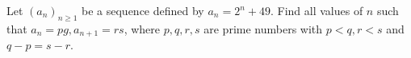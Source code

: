 Let $(a_{n})_{n\geq 1}$ be a sequence defined by $a_{n}=2^{n}+49$. Find all values of $n$ such that $a_{n}=pg, a_{n+1}=rs$,  where $p,q,r,s$ are prime numbers with $p<q, r<s$ and $q-p=s-r$.